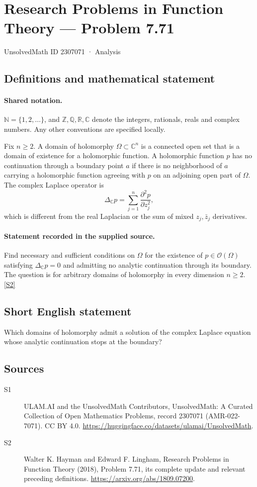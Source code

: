 \documentclass[11pt]{article}
\newcommand{\sref}[2]{\hyperlink{source:#1:#2}{[S#2]}}
\begin{document}
\setcounter{section}{2307070}
\section{Research Problems in Function Theory — Problem 7.71}\label{2307071}
{\small\sffamily UnsolvedMath ID 2307071 · Analysis}
\subsection{Definitions and mathematical statement}

\paragraph{Shared notation.}$\mathbb N=\{1,2,\ldots\}$, and $\mathbb Z,\mathbb Q,\mathbb R,\mathbb C$ denote the integers, rationals, reals and complex numbers. Any other conventions are specified locally.


Fix $n\ge2$. A domain of holomorphy $\Omega\subset\mathbb C^n$ is a connected open set that is a domain of existence for a holomorphic function. A holomorphic function $p$ has no continuation through a boundary point $a$ if there is no neighborhood of $a$ carrying a holomorphic function agreeing with $p$ on an adjoining open part of $\Omega$. The complex Laplace operator is
\[\Delta_{\mathbb C}p=\sum_{j=1}^n\frac{\partial^2p}{\partial z_j^2},
\]
which is different from the real Laplacian or the sum of mixed $z_j,\bar z_j$ derivatives.
\paragraph{Statement recorded in the supplied source.}
Find necessary and sufficient conditions on $\Omega$ for the existence of $p\in\mathcal O(\Omega)$ satisfying $\Delta_{\mathbb C}p=0$ and admitting no analytic continuation through its boundary. The question is for arbitrary domains of holomorphy in every dimension $n\ge2$. \sref{2307071}{2}
\subsection{Short English statement}
Which domains of holomorphy admit a solution of the complex Laplace equation whose analytic continuation stops at the boundary?
\subsection{Sources}
\begin{description}
\item[\hypertarget{source:2307071:1}{S1}] ULAM.AI and the UnsolvedMath Contributors, UnsolvedMath: A Curated Collection of Open Mathematics Problems, record 2307071 (AMR-022-7071). CC BY 4.0. \url{https://huggingface.co/datasets/ulamai/UnsolvedMath}.
\item[\hypertarget{source:2307071:2}{S2}] Walter K. Hayman and Edward F. Lingham, Research Problems in Function Theory (2018), Problem 7.71, its complete update and relevant preceding definitions. \url{https://arxiv.org/abs/1809.07200}.
\end{description}
\label{end:2307071}
\end{document}
